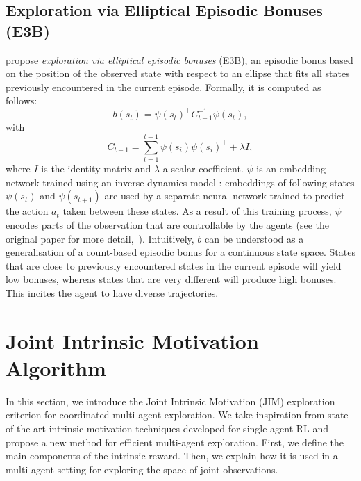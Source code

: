 \subsection{Exploration via Elliptical Episodic Bonuses (E3B)}\label{sec:JIM:E3B}

\cite{Henaff2022_E3B} propose \textit{exploration via elliptical episodic bonuses} (E3B), an episodic bonus based on the position of the observed state with respect to an ellipse that fits all states previously encountered in the current episode. Formally, it is computed as follows:
\begin{equation}\label{eq:JIM:E3B}
    b(s_t)=\psi(s_t)^\top C^{-1}_{t-1}\psi(s_t),
\end{equation}
with
\begin{equation}
    C_{t-1}=\sum_{i=1}^{t-1}\psi(s_i)\psi(s_i)^\top+\lambda I,
\end{equation}
where $I$ is the identity matrix and $\lambda$ a scalar coefficient. $\psi$ is an embedding network trained using an inverse dynamics model \citep{Pathak2017_ICM}: embeddings of following states $\psi(s_t)$ and $\psi(s_{t+1})$ are used by a separate neural network trained to predict the action $a_t$ taken between these states. As a result of this training process, $\psi$ encodes parts of the observation that are controllable by the agents (see the original paper for more detail,~\cite{Henaff2022_E3B}). Intuitively, $b$ can be understood as a generalisation of a count-based episodic bonus for a continuous state space. States that are close to previously encountered states in the current episode will yield low bonuses, whereas states that are very different will produce high bonuses. This incites the agent to have diverse trajectories. 









\section{Joint Intrinsic Motivation Algorithm}\label{sec:JIM:Algo}

In this section, we introduce the Joint Intrinsic Motivation (JIM) exploration criterion for coordinated multi-agent exploration. We take inspiration from state-of-the-art intrinsic motivation techniques developed for single-agent RL and propose a new method for efficient multi-agent exploration. 
First, we define the main components of the intrinsic reward. Then, we explain how it is used in a multi-agent setting for exploring the space of joint observations. 


